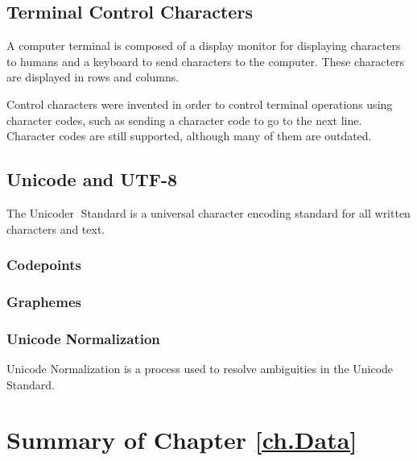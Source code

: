 \documentclass{book}
\begin{document}
\subsection{Terminal Control Characters}
A computer terminal is composed of a display monitor for displaying
characters to humans and a keyboard to send characters to the
computer. These characters are displayed in rows and columns.

Control characters were invented in order to control terminal 
operations using character codes, such as sending a character code
to go to the next line. Character codes are still supported, although
many of them are outdated.

\subsection{Unicode and UTF-8}
The Unicode\textcircled{r} Standard is a universal character
encoding standard for all written characters and text.

\subsubsection{Codepoints}

\subsubsection{Graphemes}


\subsubsection{Unicode Normalization}
Unicode Normalization is a process used to resolve ambiguities in the
Unicode Standard.

\section{Summary of Chapter \ref{ch.Data}}

\backmatter
{}
\printindex
\end{document}
